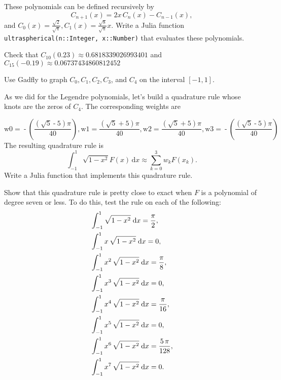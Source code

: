 \documentclass[12pt,fleqn]{exam}
\begin{document}
\begin{questions}

\question[10] These polynomials can be defined recursively by 
\begin{equation*}
 C_{n+1}(x) = 2  x \, C_n(x) - C_{n-1} (x),
\end{equation*}
and $C_0(x) = \frac{\sqrt{2}}{\sqrt{\uppi}},  C_1(x) = \frac{\sqrt{8}}{\sqrt{\uppi}} x$.  Write a Julia function \texttt{ ultraspherical(n::Integer, x::Number)}  that evaluates these polynomials. 



\question[10]  Check that $C_{10}(0.23) \approx 0.6818339026993401$  and  $C_{15}(-0.19) \approx 0.06737434860812452$

\question[10] Use Gadfly to graph $C_0, C_1, C_2, C_3$, and $C_4$ on the interval $[-1,1]$.


\question [10] As we did for the Legendre polynomials, let's build a quadrature rule whose knots are the zeros of $C_4$. The corresponding weights are

\begin{equation*}
 \ensuremath{\mathrm{w0}}\operatorname{=}\operatorname{-}\left( \frac{\left( \sqrt{5}\operatorname{-}5\right)  \ensuremath{\pi} }{40}\right) \operatorname{,}\ensuremath{\mathrm{w1}}\operatorname{=}\frac{\left( \sqrt{5}\operatorname{+}5\right)  \ensuremath{\pi} }{40}\operatorname{,}\ensuremath{\mathrm{w2}}\operatorname{=}\frac{\left( \sqrt{5}\operatorname{+}5\right)  \ensuremath{\pi} }{40}\operatorname{,}\ensuremath{\mathrm{w3}}\operatorname{=}\operatorname{-}\left( \frac{\left( \sqrt{5}\operatorname{-}5\right)  \ensuremath{\pi} }{40}\right) 
\end{equation*}
The resulting quadrature rule is
\begin{equation}
 \int_{-1}^1 \sqrt{1-x^2} F(x) \, \mathrm{d} x \approx \sum_{k=0}^3 w_k F(x_k).
\end{equation}
Write a Julia function that implements this quadrature rule.

\question [10] Show that this quadrature rule is pretty close to exact when $F$ is a polynomial of degree seven or less.  To do this, test the rule on each of the following:
\begin{align*}
&\int_{-1}^{1}{\sqrt{1-x^2}\;\mathrm{d}x}={{\pi}\over{2}} , \\
&\int_{-1 }^{1}{x\,\sqrt{1-x^2}\;\mathrm{d}x}=0 , \\
&\int_{-1}^{1}{x^2\,\sqrt{1-x^2}\;\mathrm{d}x}=  {{\pi}\over{8}} , \\
 &\int_{-1}^{1}{x^3\,\sqrt{1-x^2}\;\mathrm{d}x}=0 , \\
 &\int_{-1 }^{1}{x^4\,\sqrt{1-x^2}\;\mathrm{d}x}={{\pi}\over{16}} , \\
  &\int_{-1}^{1}{x^5\, \sqrt{1-x^2}\;\mathrm{d}x}=0 , \\
   &\int_{-1}^{1}{x^6\,\sqrt{1-x^2}\;\mathrm{d}x}={{5\,\pi  }\over{128}} , \\
   &\int_{-1}^{1}{x^7\,\sqrt{1-x^2}\;\mathrm{d}x}=0. 
 \end{align*}

\end{questions}
\end{document}
